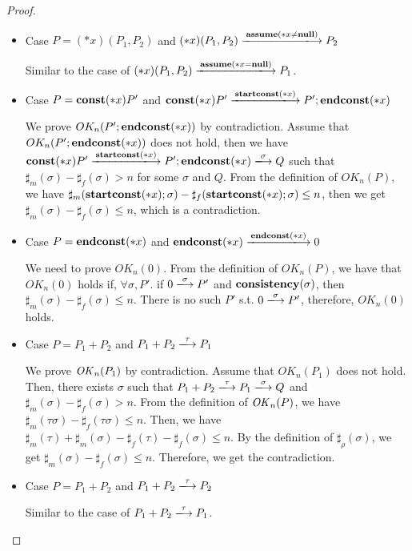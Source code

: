 \begin{proof}
\begin{itemize}
\item Case \( P = (*x)(P_1,P_2) \) and \( (*x)(P_1,P_2)\xlongrightarrow{\sassxn} P_2\)

  Similar to the case of \( (*x)(P_1,P_2) \xlongrightarrow{\sassx}
  P_1\).

  \item Case \(P = \mathbf{const}(*x) P'\) and \( \scon\Sirx P'
    \xlongrightarrow{\Startconst} P';\Endconst \) 

    We prove \( OK_n(P';\mathbf{endconst}(*x)) \) by
    contradiction. Assume that \( OK_n(P';\mathbf{endconst}(*x)) \) does not
    hold, then we have \( \scon\Sirx P' \xlongrightarrow{\Startconst}
    P';\Endconst \xlongrightarrow{\sigma} Q \) such that \(
    \sharp_m(\sigma) - \sharp_f(\sigma) > n \) for some \( \sigma \)
    and \( Q \).  From the definition of \( OK_n(P)\), we have \(
    \sharp_m(\mathbf{startconst}(*x);\sigma) - \sharp_f(\mathbf{startconst}(*x);\sigma) \le n
    \), then we get \( \sharp_m(\sigma) - \sharp_f(\sigma) \le n \),
    which is a contradiction.

\item Case \(P = \mathbf{endconst}(*x) \) and \( \Endconst \xlongrightarrow{\Endconst}  0 \)

    We need to prove \( OK_n(0) \). From the definition of \( OK_n(P)
    \), we have that \( OK_n(0) \) holds if, \( \forall \sigma, P'
    \). if \( 0 \xlongrightarrow{\sigma} P' \) and \( \mathbf{consistency}(\sigma)\), then
    \( \sharp_m(\sigma) - \sharp_f(\sigma) \le n \). There is no such
    \(P'\) s.t. \( 0 \xlongrightarrow{\sigma} P' \), therefore, \( OK_n(0)
    \) holds.

\item Case $P = P_{1} + P_{2}$ and \(P_1 + P_2 \xlongrightarrow{\tau} P_1\)

  We prove \(\mathit{OK}_n(P_1)\) by contradiction.  Assume that
  \(OK_{n}(P_1)\) does not hold.  Then, there exists \(\sigma\) such
  that \(P_{1} + P_{2} \xlongrightarrow{\tau} P_{1}
  \xlongrightarrow{\sigma} Q\) and \(\sharp_{m}(\sigma) -
  \sharp_{f}(\sigma) > n\).  From the definition of \(\mathit{OK}_n(P)\), we
  have \(\sharp_m(\tau\sigma) -\sharp_f(\tau\sigma) \le n\). Then, we
  have \(\sharp_m(\tau) + \sharp_m(\sigma) - \sharp_f(\tau)
  -\sharp_f(\sigma) \le n\).  By the definition of \(
  \sharp_\rho(\sigma) \), we get \( \sharp_m(\sigma) -\sharp_f(\sigma)
  \le n \). Therefore, we get the contradiction.

\item Case $P = P_{1} + P_{2}$ and \(P_1 + P_2 \xlongrightarrow{\tau} P_2\)

  Similar to the case of \(P_1 + P_2 \xlongrightarrow{\tau} P_1\).


\end{itemize}
\end{proof}
